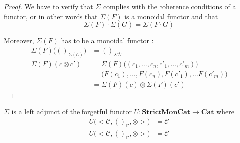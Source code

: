 \begin{proof}
    We have to verify that $\Sigma$ complies with the coherence conditions of a functor, or in other words that $\Sigma(F)$ is a monoidal functor and that
    $$\Sigma(F) \cdot \Sigma(G) = \Sigma(F\cdot G) $$

    Moreover, $\Sigma(F)$ has to be a monoidal functor :%
    \begin{align*}
        \Sigma(F)\big(()_{\Sigma(\mathcal{C})}\big)
         & = ()_\mathcal{\Sigma{D}}                                   \\
        \Sigma(F)(c\otimes c')
         & = \Sigma(F) \big((c_1, \dots, c_n,c'_1, \dots, c'_m) \big) \\
         & =  \big(F(c_1),\dots,F(c_n),F(c'_1),...F(c'_m)\big)        \\
         & = \Sigma(F)(c) \otimes \Sigma(F)(c')
    \end{align*}
\end{proof}

\begin{prop}
    $\Sigma$ is a left adjunct of the forgetful functor $U : \textbf{StrictMonCat} \rightarrow \textbf{Cat}$ where
    \begin{align*}
        U\big(\big<\mathcal{C},()_{\mathcal{C}},\otimes\big>\big)
         & = \mathcal{C} \\
        U\big(\big<\mathcal{C},()_{\mathcal{C}},\otimes\big>\big)
         & = \mathcal{C} \\
    \end{align*}
\end{prop}

